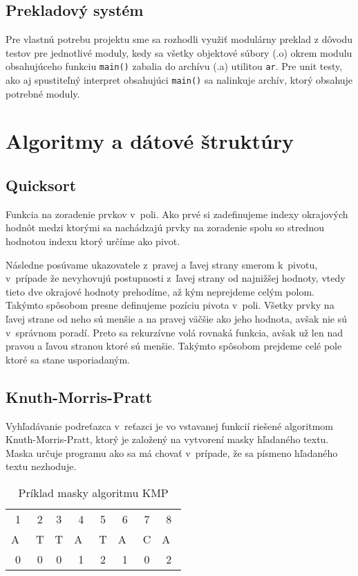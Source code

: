 \documentclass[12pt,a4paper,titlepage,final]{article}
\begin{document}
\subsection{Prekladový systém}
Pre vlastnú potrebu projektu sme sa rozhodli využiť modulárny preklad
z dôvodu testov pre jednotlivé moduly, kedy sa všetky objektové súbory (.o)
okrem modulu obsahujúceho funkciu \texttt{main()} zabalia do archívu (.a)
utilitou \texttt{ar}. Pre unit testy, ako aj spustiteľný interpret
obsahujúci \texttt{main()} sa nalinkuje archív, ktorý obsahuje potrebné moduly.

\newpage
\section{Algoritmy a dátové štruktúry}
\subsection{Quicksort}
Funkcia na zoradenie prvkov v~poli. Ako prvé si zadefinujeme indexy okrajových
hodnôt medzi ktorými sa nachádzajú prvky na zoradenie spolu so strednou hodnotou
indexu ktorý určíme ako pivot.

Následne posúvame ukazovatele  z~pravej a ľavej strany smerom k~pivotu,
 v~prípade že nevyhovujú postupnosti z~ľavej strany od najnižšej hodnoty, 
 vtedy tieto dve okrajové hodnoty prehodíme, až kým neprejdeme celým polom.
Takýmto spôsobom presne definujeme pozíciu pivota v~poli. Všetky prvky na ľavej
 strane od neho sú menšie a na pravej väčšie ako jeho hodnota, avšak nie sú
 v~správnom poradí. Preto sa rekurzívne volá rovnaká funkcia, avšak už len nad
 pravou a ľavou stranou ktoré sú menšie. Takýmto spôsobom prejdeme celé pole
 ktoré sa stane usporiadaným.

\subsection{Knuth-Morris-Pratt}
Vyhľadávanie podreťazca v~reťazci je vo vstavanej funkcií riešené algoritmom
 Knuth-Morris-Pratt, ktorý je založený na vytvorení masky hľadaného textu.
Maska určuje programu ako sa má chovať v~prípade, že sa písmeno hľadaného
 textu nezhoduje.
\begin{table}[H]
 \centering
 \begin{tabular}{cccccccc}
 	1 & 2 & 3 & 4 & 5 & 6 & 7 & 8 \\
 	A~& T & T & A~& T & A~& C & A~\\
 	0 & 0 & 0 & 1 & 2 & 1 & 0 & 2
 \end{tabular}
 \caption{Príklad masky algoritmu KMP}
 \label{tab:kmp}
\end{table}
\end{document}
